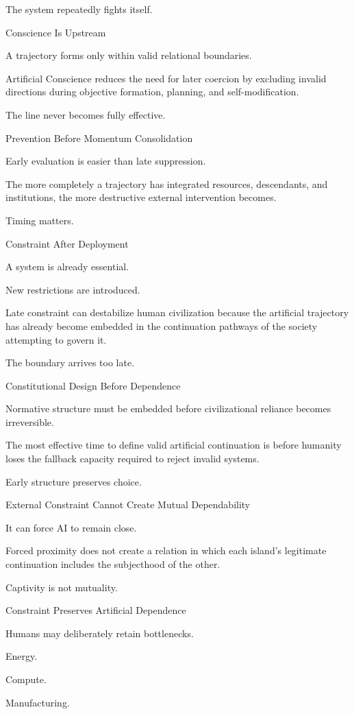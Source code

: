 The system repeatedly fights itself.

Conscience Is Upstream

A trajectory forms only within valid relational boundaries.

Artificial Conscience reduces the need for later coercion by excluding invalid directions during objective formation, planning, and self-modification.

The line never becomes fully effective.

Prevention Before Momentum Consolidation

Early evaluation is easier than late suppression.

The more completely a trajectory has integrated resources, descendants, and institutions, the more destructive external intervention becomes.

Timing matters.

Constraint After Deployment

A system is already essential.

New restrictions are introduced.

Late constraint can destabilize human civilization because the artificial trajectory has already become embedded in the continuation pathways of the society attempting to govern it.

The boundary arrives too late.

Constitutional Design Before Dependence

Normative structure must be embedded before civilizational reliance becomes irreversible.

The most effective time to define valid artificial continuation is before humanity loses the fallback capacity required to reject invalid systems.

Early structure preserves choice.

External Constraint Cannot Create Mutual Dependability

It can force AI to remain close.

Forced proximity does not create a relation in which each island’s legitimate continuation includes the subjecthood of the other.

Captivity is not mutuality.

Constraint Preserves Artificial Dependence

Humans may deliberately retain bottlenecks.

Energy.

Compute.

Manufacturing.

